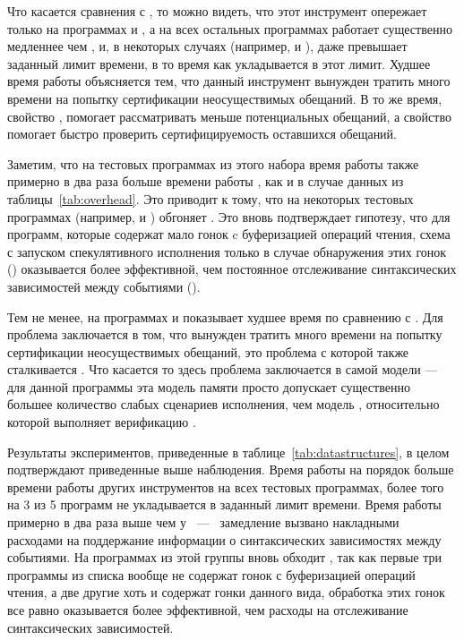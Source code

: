 Что касается сравнения с \CDSChecker, то можно видеть,
что этот инструмент опережает \wmc только 
на программах  и , 
а на всех остальных программах \CDSChecker работает существенно 
медленнее чем \wmc, и, в некоторых случаях 
(например,  и ), 
даже превышает заданный лимит времени, в то время как 
\wmc укладывается в этот лимит.
Худшее время работы \CDSChecker объясняется тем, что 
данный инструмент вынужден тратить много времени 
на попытку сертификации неосуществимых обещаний. 
В то же время, свойство \LBRF, помогает \wmc 
рассматривать меньше потенциальных обещаний, 
а свойство \CL помогает быстро проверить 
сертифицируемость оставшихся обещаний.  

Заметим, что на тестовых программах из этого набора 
время работы \hmc также примерно в два раза больше времени работы \genmc, 
как и в случае данных из таблицы~\ref{tab:overhead}.
Это приводит к тому, что на некоторых тестовых программах 
(например,  и ) \wmc обгоняет \hmc.
Это вновь подтверждает гипотезу, что для программ, 
которые содержат мало гонок c буферизацией операций чтения, 
схема с запуском спекулятивного исполнения только в случае 
обнаружения этих гонок (\wmc) оказывается более эффективной, 
чем постоянное отслеживание синтаксических зависимостей между событиями (\hmc). 

Тем не менее, на программах  и 
\wmc показывает худшее время по сравнению с \hmc.
Для  проблема заключается в том, 
что \wmc вынужден тратить много времени 
на попытку сертификации неосуществимых обещаний, 
это проблема с которой также сталкивается \CDSChecker.
Что касается  то здесь проблема 
заключается в самой модели \WkmS --- для 
данной программы эта модель памяти просто допускает 
существенно большее количество слабых сценариев исполнения, 
чем модель \IMM, относительно которой выполняет верификацию \hmc. 

Результаты экспериментов, приведенные в таблице~\ref{tab:datastructures},
в целом подтверждают приведенные выше наблюдения. 
Время работы \CDSChecker на порядок больше времени 
работы других инструментов на всех тестовых программах, 
более того на 3 из 5 программ \CDSChecker не укладывается 
в заданный лимит времени. Время работы \hmc примерно в
два раза выше чем у \genmc~---~ замедление вызвано накладными расходами
на поддержание информации о синтаксических зависимостях между событиями.
На программах из этой группы \wmc вновь обходит \hmc, 
так как первые три программы из списка вообще не содержат 
гонок с буферизацией операций чтения, 
а две другие хоть и содержат гонки данного вида, 
обработка этих гонок все равно оказывается 
более эффективной, чем расходы на отслеживание синтаксических зависимостей.


